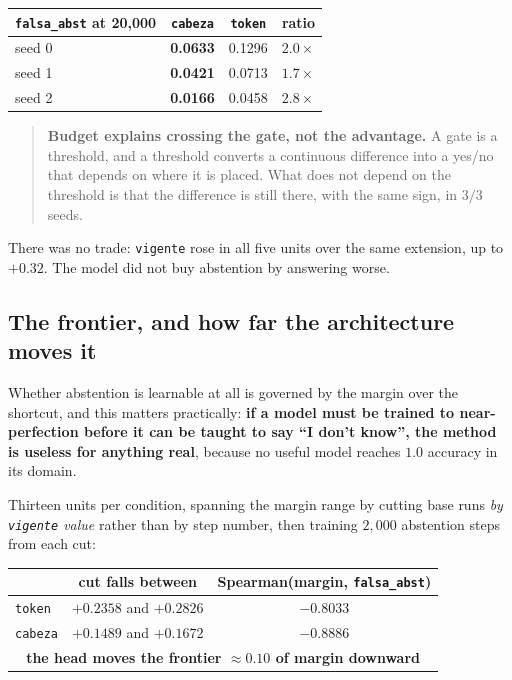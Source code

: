 \documentclass[11pt,a4paper]{article}
\begin{document}
\begin{center}
\begin{tabular}{lccc}
\toprule
\texttt{falsa\_abst} at 20{,}000 & \texttt{cabeza} & \texttt{token} & ratio \\
\midrule
seed 0 & \textbf{0.0633} & 0.1296 & $2.0\times$ \\
seed 1 & \textbf{0.0421} & 0.0713 & $1.7\times$ \\
seed 2 & \textbf{0.0166} & 0.0458 & $2.8\times$ \\
\bottomrule
\end{tabular}
\end{center}

\begin{quote}
\textbf{Budget explains crossing the gate, not the advantage.} A gate is a threshold, and a
threshold converts a continuous difference into a yes/no that depends on where it is placed. What
does not depend on the threshold is that the difference is still there, with the same sign, in
$3/3$ seeds.
\end{quote}

There was no trade: \texttt{vigente} rose in all five units over the same extension, up to $+0.32$.
The model did not buy abstention by answering worse.

\subsection{The frontier, and how far the architecture moves it}
\label{sec:frontera}

Whether abstention is learnable at all is governed by the margin over the shortcut, and this matters
practically: \textbf{if a model must be trained to near-perfection before it can be taught to say ``I
don't know'', the method is useless for anything real}, because no useful model reaches $1.0$
accuracy in its domain.

Thirteen units per condition, spanning the margin range by cutting base runs \emph{by
\texttt{vigente} value} rather than by step number, then training $2{,}000$ abstention steps from
each cut:

\begin{center}
\begin{tabular}{lcc}
\toprule
 & cut falls between & Spearman(margin, \texttt{falsa\_abst}) \\
\midrule
\texttt{token}  & $+0.2358$ and $+0.2826$ & $-0.8033$ \\
\texttt{cabeza} & $+0.1489$ and $+0.1672$ & $-0.8886$ \\
\midrule
\multicolumn{3}{c}{\textbf{the head moves the frontier $\approx 0.10$ of margin downward}}\\
\bottomrule
\end{tabular}
\end{center}
\end{document}
